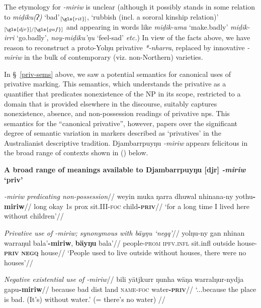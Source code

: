 The etymology for \textit{-miriw} is unclear (although it possibly stands in some relation to \textit{miḏiku(ʔ)} `bad'$_{[\gls{rit}]}$, `rubbish (incl. a sororal kinship relation)'$_{[\gls{djr}]/[\gls{guf}]}$ and appearing in words like \textit{miḏik-uma} `make.badly' \textit{miḏik-irri} `go.badly', \textit{noy-miḏiku'ŋu} `feel-sad' \textit{etc.}) In view of the facts above, we have reason to reconstruct a proto-Yolŋu privative \textit{*-nharra}, replaced by innovative \textit{-miriw} in the bulk of contemporary (viz. non-Northern) varieties.

In §~\ref{priv-sems} above, we saw a potential semantics for canonical uses of privative marking. This semantics, which understands the privative as a quantifier that predicates nonexistence of the NP in its scope, restricted to a domain that is provided elsewhere in the discourse, suitably captures nonexistence, absence, and non-possession readings of privative \acrshort{np}s. This semantics for the ``canonical privative'', however, papers over the significant degree of semantic variation in markers described as `privatives' in the Australianist descriptive tradition. Djambarrpuyŋu \textit{-miriw} appears felicitous in the broad range of contexts shown in (\nextx) below.

\pex \textbf{A broad range of meanings available to Djambarrpuyŋu [\gls{djr}] \textit{-miriw} `\gls{priv}'} 

\a\begingl\glpreamble \textit{\emph{-miriw} predicating non-possession}//
\gla weyin muka ŋarra dhuwal nhinana-ny yothu\textbf{-miriw}//
\glb long okay 1\gls{s} \gls{prox} sit.III-\textsc{foc} child\textsc{\textbf{-priv}}//
\glft`for a long time I lived here without children'//\endgl

\a\begingl\glpreamble \textit{Privative use of \emph{-miriw}; synonymous with \em{bäyŋu} `\gls{negq}'}//
\gla yolŋu-ny gan nhinan warraŋul bala'\textbf{-miriw}, \textbf{bäyŋu} bala'//
\glb people-\textsc{prom} \textsc{ipfv.infl} sit.\gls{infl} outside house\textsc{-\textbf{priv}} \textsc{\textbf{negq}} house//
\glft `People used to live outside without houses, there were no houses'//
\endgl

\a\begingl\glpreamble \textit{Negative existential use of \emph{-miriw}}//
\gla bili yätjkurr ŋunha wäŋa warralŋur-nydja gapu\textbf{-miriw}//
\glb because bad \gls{dist} land \textsc{name-foc} water\textsc{\textbf{-priv}}//
\glft `...because the place is bad. (It's) without water.' (= there's no water) 		//
\endgl

